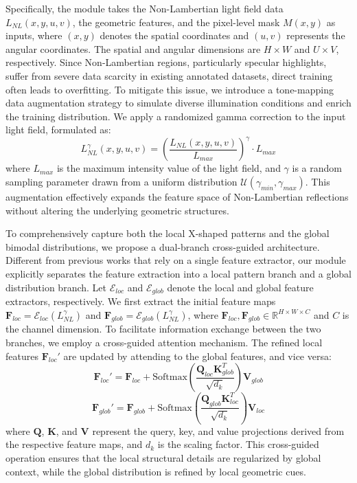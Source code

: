 \documentclass[lettersize,journal]{IEEEtran}
\begin{document}
Specifically, the module takes the Non-Lambertian light field data $L_{NL}(x,y,u,v)$, the geometric features, and the pixel-level mask $M(x,y)$ as inputs, where $(x,y)$ denotes the spatial coordinates and $(u,v)$ represents the angular coordinates. The spatial and angular dimensions are $H \times W$ and $U \times V$, respectively. Since Non-Lambertian regions, particularly specular highlights, suffer from severe data scarcity in existing annotated datasets, direct training often leads to overfitting. To mitigate this issue, we introduce a tone-mapping data augmentation strategy to simulate diverse illumination conditions and enrich the training distribution. We apply a randomized gamma correction to the input light field, formulated as:
\begin{equation} \label{eq:ch3_11}
L_{NL}^{\gamma}(x,y,u,v) = \left( \frac{L_{NL}(x,y,u,v)}{L_{max}} \right)^{\gamma} \cdot L_{max}
\end{equation}
where $L_{max}$ is the maximum intensity value of the light field, and $\gamma$ is a random sampling parameter drawn from a uniform distribution $\mathcal{U}(\gamma_{min}, \gamma_{max})$. This augmentation effectively expands the feature space of Non-Lambertian reflections without altering the underlying geometric structures.

To comprehensively capture both the local X-shaped patterns and the global bimodal distributions, we propose a dual-branch cross-guided architecture. Different from previous works that rely on a single feature extractor, our module explicitly separates the feature extraction into a local pattern branch and a global distribution branch. Let $\mathcal{E}_{loc}$ and $\mathcal{E}_{glob}$ denote the local and global feature extractors, respectively. We first extract the initial feature maps $\mathbf{F}_{loc} = \mathcal{E}_{loc}(L_{NL}^{\gamma})$ and $\mathbf{F}_{glob} = \mathcal{E}_{glob}(L_{NL}^{\gamma})$, where $\mathbf{F}_{loc}, \mathbf{F}_{glob} \in \mathbb{R}^{H \times W \times C}$ and $C$ is the channel dimension. To facilitate information exchange between the two branches, we employ a cross-guided attention mechanism. The refined local features $\mathbf{F}_{loc}'$ are updated by attending to the global features, and vice versa:
\begin{equation} \label{eq:ch3_12}
\mathbf{F}_{loc}' = \mathbf{F}_{loc} + \text{Softmax}\left(\frac{\mathbf{Q}_{loc}\mathbf{K}_{glob}^T}{\sqrt{d_k}}\right)\mathbf{V}_{glob}
\end{equation}
\begin{equation} \label{eq:ch3_13}
\mathbf{F}_{glob}' = \mathbf{F}_{glob} + \text{Softmax}\left(\frac{\mathbf{Q}_{glob}\mathbf{K}_{loc}^T}{\sqrt{d_k}}\right)\mathbf{V}_{loc}
\end{equation}
where $\mathbf{Q}$, $\mathbf{K}$, and $\mathbf{V}$ represent the query, key, and value projections derived from the respective feature maps, and $d_k$ is the scaling factor. This cross-guided operation ensures that the local structural details are regularized by global context, while the global distribution is refined by local geometric cues.
\end{document}
